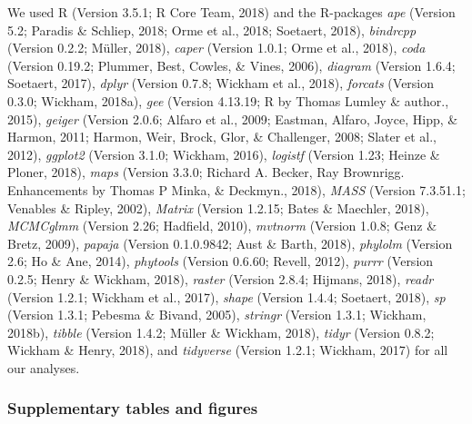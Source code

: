 \documentclass[man,floatsintext]{apa6}
\theoremstyle{definition}
\theoremstyle{definition}
\theoremstyle{definition}
\theoremstyle{remark}
\begin{document}
We used R (Version 3.5.1; R Core Team, 2018) and the R-packages
\emph{ape} (Version 5.2; Paradis \& Schliep, 2018; Orme et al., 2018;
Soetaert, 2018), \emph{bindrcpp} (Version 0.2.2; Müller, 2018),
\emph{caper} (Version 1.0.1; Orme et al., 2018), \emph{coda} (Version
0.19.2; Plummer, Best, Cowles, \& Vines, 2006), \emph{diagram} (Version
1.6.4; Soetaert, 2017), \emph{dplyr} (Version 0.7.8; Wickham et al.,
2018), \emph{forcats} (Version 0.3.0; Wickham, 2018a), \emph{gee}
(Version 4.13.19; R by Thomas Lumley \& author., 2015), \emph{geiger}
(Version 2.0.6; Alfaro et al., 2009; Eastman, Alfaro, Joyce, Hipp, \&
Harmon, 2011; Harmon, Weir, Brock, Glor, \& Challenger, 2008; Slater et
al., 2012), \emph{ggplot2} (Version 3.1.0; Wickham, 2016),
\emph{logistf} (Version 1.23; Heinze \& Ploner, 2018), \emph{maps}
(Version 3.3.0; Richard A. Becker, Ray Brownrigg. Enhancements by Thomas
P Minka, \& Deckmyn., 2018), \emph{MASS} (Version 7.3.51.1; Venables \&
Ripley, 2002), \emph{Matrix} (Version 1.2.15; Bates \& Maechler, 2018),
\emph{MCMCglmm} (Version 2.26; Hadfield, 2010), \emph{mvtnorm} (Version
1.0.8; Genz \& Bretz, 2009), \emph{papaja} (Version 0.1.0.9842; Aust \&
Barth, 2018), \emph{phylolm} (Version 2.6; Ho \& Ane, 2014),
\emph{phytools} (Version 0.6.60; Revell, 2012), \emph{purrr} (Version
0.2.5; Henry \& Wickham, 2018), \emph{raster} (Version 2.8.4; Hijmans,
2018), \emph{readr} (Version 1.2.1; Wickham et al., 2017), \emph{shape}
(Version 1.4.4; Soetaert, 2018), \emph{sp} (Version 1.3.1; Pebesma \&
Bivand, 2005), \emph{stringr} (Version 1.3.1; Wickham, 2018b),
\emph{tibble} (Version 1.4.2; Müller \& Wickham, 2018), \emph{tidyr}
(Version 0.8.2; Wickham \& Henry, 2018), and \emph{tidyverse} (Version
1.2.1; Wickham, 2017) for all our analyses.

\hypertarget{supplementary-tables-and-figures}{%
\subsubsection{Supplementary tables and
figures}\label{supplementary-tables-and-figures}}
\end{document}
